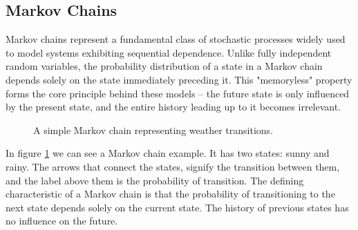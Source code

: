 \subsection{Markov Chains}
\label{appendix:markov_chains}

Markov chains represent a fundamental class of stochastic processes widely used to model systems exhibiting sequential dependence. Unlike fully independent random variables, the probability distribution of a state in a Markov chain depends solely on the state immediately preceding it. This "memoryless" property forms the core principle behind these models – the future state is only influenced by the present state, and the entire history leading up to it becomes irrelevant.

\begin{figure}
  \centering
  \caption{A simple Markov chain representing weather transitions.}
  \label{fig:markov_chain}
\end{figure}

In figure \ref{fig:markov_chain} we can see a Markov chain example. It has two states: sunny and rainy. The arrows that connect the states, signify the transition between them, and the label above them is the probability of transition. The defining characteristic of a Markov chain is that the probability of transitioning to the next state depends solely on the current state. The history of previous states has no influence on the future. 